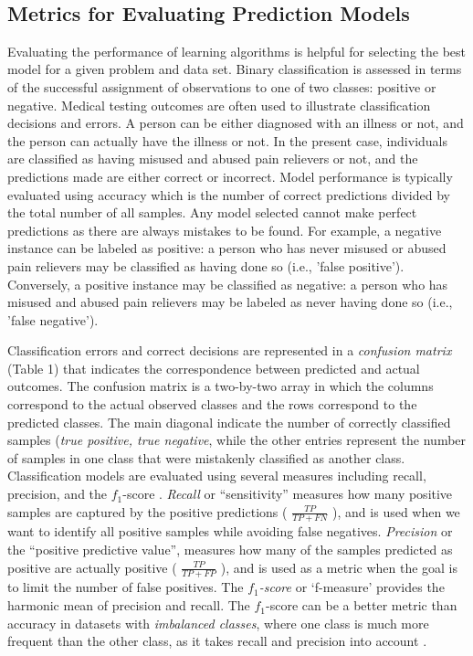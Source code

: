 \\\documentclass[sigconf]{acmart}
\begin{document}

\subsection{Metrics for Evaluating Prediction Models}

Evaluating the performance of learning algorithms is helpful for selecting 
the best model for a given problem and data set. Binary classification is 
assessed in terms of the successful assignment of observations to one of two 
classes: positive or negative. Medical testing outcomes are often used to 
illustrate classification decisions and errors. A person can be either 
diagnosed with an illness or not, and the person can actually have the 
illness or not. In the present case, individuals are classified as having 
misused and abused pain relievers or not, and the predictions made are either 
correct or incorrect. Model performance is typically evaluated using accuracy 
which is the number of correct predictions divided by the total number of 
all samples. Any model selected cannot make perfect predictions as there are 
always mistakes to be found. For example, a negative instance can be labeled 
as positive: a person who has never misused or abused pain relievers may be 
classified as having done so (i.e., 'false positive'). Conversely, a positive 
instance may be classified as negative: a person who has misused and abused 
pain relievers may be labeled as never having done so (i.e., 'false negative').

Classification errors and correct decisions are represented in a 
\emph{confusion matrix} (Table 1) that indicates the correspondence between 
predicted and actual outcomes. The confusion matrix is a two-by-two array in 
which the columns correspond to the actual observed classes and the rows 
correspond to the predicted classes. The main diagonal indicate the number of 
correctly classified samples (\emph{true positive, true negative}, while the 
other entries represent the number of samples in one class that were mistakenly 
classified as another class. Classification models are evaluated using several 
measures including recall, precision, and the $f_1$-score \cite{wiki18}. 
\emph{Recall} or ``sensitivity'' measures how many positive samples are 
captured by the positive predictions ( \(\frac{TP}{TP+FN}\) ), and is used 
when we want to identify all positive samples while avoiding false negatives. 
\emph{Precision} or the ``positive predictive value'', measures how many of 
the samples predicted as positive are actually positive 
( \(\frac{TP}{TP+FP}\) ), and is used as a metric when the goal is to limit 
the number of false positives. The \emph{$f_1$-score} or `f-measure' provides 
the harmonic mean of precision and recall. The $f_1$-score can be a better 
metric than accuracy in datasets with \emph{imbalanced classes}, where one 
class is much more frequent than the other class, as it takes recall and 
precision into account \cite{muller17}.
\end{document}
